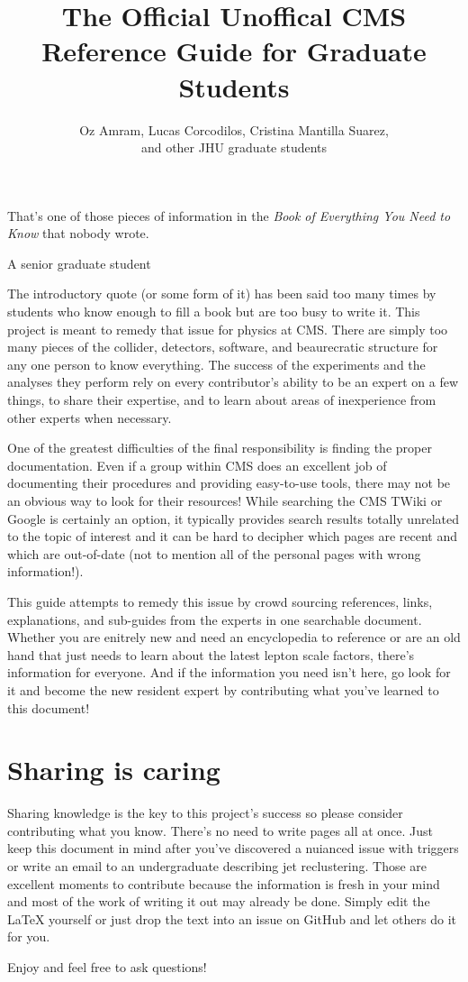 \documentclass{article}
\begin{document}
\title{The Official Unoffical CMS Reference Guide for Graduate Students}
\author{Oz Amram, Lucas Corcodilos, Cristina Mantilla Suarez,\\ and other JHU graduate students}

\maketitle

\epigraph{That's one of those pieces of information in the \textit{Book of Everything You Need to Know} that nobody wrote.}{A senior graduate student}

The introductory quote (or some form of it) has been said too many times by students who know enough to fill a book but are too busy to write it. This project is meant to remedy that issue for physics at CMS. There are simply too many pieces of the collider, detectors, software, and beaurecratic structure for any one person to know everything. The success of the experiments and the analyses they perform rely on every contributor's ability to be an expert on a few things, to share their expertise, and to learn about areas of inexperience from other experts when necessary. 

One of the greatest difficulties of the final responsibility is finding the proper documentation. Even if a group within CMS does an excellent job of documenting their procedures and providing easy-to-use tools, there may not be an obvious way to look for their resources! While searching the CMS TWiki or Google is certainly an option, it typically provides search results totally unrelated to the topic of interest and it can be hard to decipher which pages are recent and which are out-of-date (not to mention all of the personal pages with wrong information!). 

This guide attempts to remedy this issue by crowd sourcing references, links, explanations, and sub-guides from the experts in one searchable document. Whether you are enitrely new and need an encyclopedia to reference or are an old hand that just needs to learn about the latest lepton scale factors, there's information for everyone. And if the information you need isn't here, go look for it and become the new resident expert by contributing what you've learned to this document! 

\section*{Sharing is caring}
Sharing knowledge is the key to this project's success so please consider contributing what you know. There's no need to write pages all at once. Just keep this document in mind after you've discovered a nuianced issue with triggers or write an email to an undergraduate describing jet reclustering. Those are excellent moments to contribute because the information is fresh in your mind and most of the work of writing it out may already be done. Simply edit the LaTeX yourself or just drop the text into an issue on GitHub and let others do it for you.

Enjoy and feel free to ask questions!

\clearpage




\clearpage
\printglossary
\end{document}
